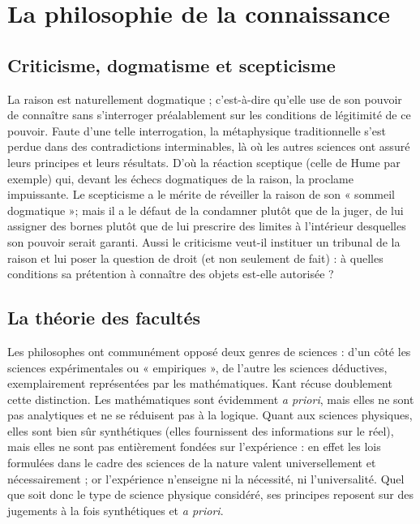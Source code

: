 \section{La philosophie de la connaissance}


\subsection{Criticisme, dogmatisme et scepticisme}

La raison est naturellement dogmatique ;
c'est-à-dire qu’elle use de son pouvoir
de connaître sans s'interroger préalablement
sur les conditions de légitimité de
ce pouvoir. Faute d’une telle interrogation,
la métaphysique traditionnelle s’est
perdue dans des contradictions interminables,
là où les autres sciences ont
assuré leurs principes et leurs résultats.
D'où la réaction sceptique (celle de
Hume par exemple) qui, devant les
échecs dogmatiques de la raison, la proclame
impuissante. Le scepticisme a le
mérite de réveiller la raison de son
« sommeil dogmatique »; mais il a le
défaut de la condamner plutôt que de la
juger, de lui assigner des bornes plutôt
que de lui prescrire des limites à l’intérieur
desquelles son pouvoir serait
garanti. Aussi le criticisme veut-il instituer
un tribunal de la raison et lui poser
la question de droit (et non seulement
de fait) : à quelles conditions sa prétention
à connaître des objets est-elle autorisée ?

\subsection{La théorie des facultés}

Les philosophes ont communément
opposé deux genres de sciences : d’un
côté les sciences expérimentales ou
« empiriques », de l’autre les sciences
déductives, exemplairement représentées
par les mathématiques. Kant récuse
doublement cette distinction. Les mathématiques
sont évidemment {\it a priori},
%
mais elles ne sont pas analytiques et ne
se réduisent pas à la logique. Quant aux
sciences physiques, elles sont bien sûr
synthétiques (elles fournissent des
informations sur le réel), mais elles ne
sont pas entièrement fondées sur l’expérience :
en effet les lois formulées
dans le cadre des sciences de la nature
valent universellement et nécessairement ;
or l'expérience n’enseigne ni la
nécessité, ni l’universalité. Quel que
soit donc le type de science physique
considéré, ses principes reposent sur
des jugements à la fois synthétiques et {\it a
priori}.

